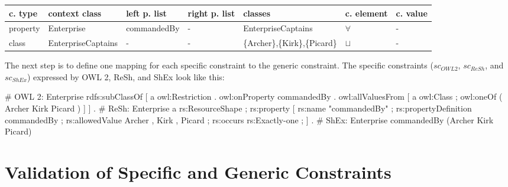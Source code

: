 \documentclass{llncs}
\newcommand{\ms}[1]{\texttt{#1}}
\newenvironment{gcotable}{
  \scriptsize
  \sffamily
  \vspace{0cm}
	\begin{center}
  \begin{tabular}{l|l|l|l|l|l|l}
  \hline
  \textbf{c. type} & \textbf{context class} & \textbf{left p. list} & \textbf{right p. list} & \textbf{classes} & \textbf{c. element} & \textbf{c. value} \\
  \hline

}{
  \hline
  \end{tabular}
	\end{center}
}
\begin{document}
\begin{gcotable}
property & Enterprise & commandedBy & - & EnterpriseCaptains & $\forall$ & - \\
class & EnterpriseCaptains & - & - & \{Archer\},\{Kirk\},\{Picard\} & $\sqcup$ & - \\
\end{gcotable}

The next step is to define one mapping for each specific constraint to the generic constraint.
The specific constraints (\ms{$sc_{OWL 2}$}, \ms{$sc_{ReSh}$}, and \ms{$sc_{ShEx}$}) expressed by OWL 2, ReSh, and ShEx look like this:

\begin{ex}
# OWL 2:
Enterprise rdfs:subClassOf [ a owl:Restriction .
    owl:onProperty commandedBy .
    owl:allValuesFrom [ a owl:Class ;
        owl:oneOf ( Archer Kirk Picard ) ] ] .
# ReSh:
Enterprise a rs:ResourceShape ; rs:property [
    rs:name "commandedBy" ; rs:propertyDefinition commandedBy ;
    rs:allowedValue Archer , Kirk , Picard ;
    rs:occurs rs:Exactly-one ; ] .
# ShEx:
Enterprise {
    commandedBy (Archer Kirk Picard) }
\end{ex}


\section{Validation of Specific and Generic Constraints}
\label{sec:validation}
\end{document}

